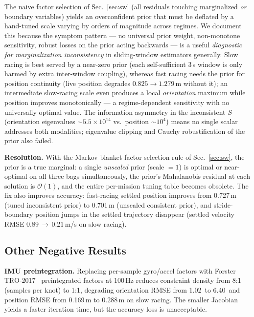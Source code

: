 \documentclass[conference]{IEEEtran}
\begin{document}
The naive factor selection of Sec.~\ref{sec:sw} (all residuals touching
marginalized \emph{or} boundary variables) yields an overconfident prior
that must be deflated by a hand-tuned scale varying by orders of
magnitude across regimes.  We document this because the symptom pattern
--- no universal prior weight, non-monotone sensitivity, robust losses
on the prior acting backwards --- is a useful \emph{diagnostic for
marginalization inconsistency} in sliding-window estimators generally.
Slow racing is best served by a near-zero prior (each self-sufficient
3\,s window is only harmed by extra inter-window coupling), whereas fast
racing needs the prior for position continuity (live position degrades
$0.825\to1.279$\,m without it); an intermediate slow-racing scale even
produces a local \emph{orientation} maximum while position improves
monotonically --- a regime-dependent sensitivity with no universally
optimal value.  The information asymmetry in the inconsistent $S$
(orientation eigenvalues $\sim$$5.5{\times}10^{14}$ vs.\ position
$\sim$$10^4$) means no single scalar addresses both modalities;
eigenvalue clipping and Cauchy robustification of the prior also failed.

\textbf{Resolution.}
With the Markov-blanket factor-selection rule of Sec.~\ref{sec:sw},
the prior is a true marginal: a single \emph{unscaled} prior
(scale $=1$) is optimal or near-optimal on all three bags
simultaneously, the prior's Mahalanobis residual at each solution is
$\mathcal{O}(1)$, and the entire per-mission tuning table becomes
obsolete.  The fix also improves accuracy: fast-racing settled
position improves from 0.727\,m (tuned inconsistent prior) to
0.701\,m (unscaled consistent prior), and stride-boundary position
jumps in the settled trajectory disappear (settled velocity RMSE
0.89\,$\to$\,0.21\,m/s on slow racing).

\subsection{Other Negative Results}
\label{sec:negative}

\textbf{IMU preintegration.}
Replacing per-sample gyro/accel factors with Forster
TRO-2017~\cite{forster2017manifold} preintegrated factors at 100\,Hz
reduces constraint density from 8:1 (samples per knot) to 1:1,
degrading orientation RMSE from 1.02\degree\ to 6.40\degree\ and
position RMSE from 0.169\,m to 0.288\,m on slow racing.
The smaller Jacobian yields a faster iteration time,
but the accuracy loss is unacceptable.
\end{document}
